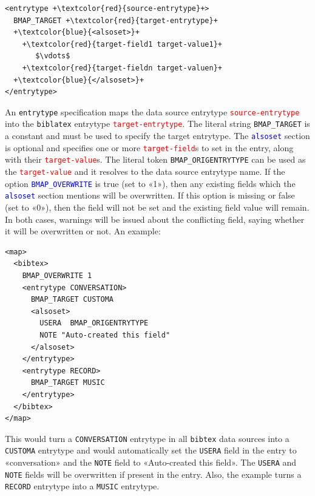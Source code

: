 \documentclass{ltxdockit}
\begin{document}

\lstset{showspaces=false}
\begin{lstlisting}[escapechar=+,mathescape=true]
<entrytype +\textcolor{red}{source-entrytype}+>
  BMAP_TARGET +\textcolor{red}{target-entrytype}+
  +\textcolor{blue}{<alsoset>}+
    +\textcolor{red}{target-field1 target-value1}+
       $\vdots$
    +\textcolor{red}{target-fieldn target-valuen}+
  +\textcolor{blue}{</alsoset>}+
</entrytype>
\end{lstlisting}

\noindent An \verb+entrytype+ specification maps the data source
entrytype \textcolor{red}{\texttt{source-entrytype}} into the \verb+biblatex+
entrytype \textcolor{red}{\texttt{target-entrytype}}. The literal string \verb+BMAP_TARGET+
is a constant and must be used to specify the target entrytype. The
\textcolor{blue}{\texttt{alsoset}} section is optional and specifies one
or more \textcolor{red}{\texttt{target-field}}s to set in the entry, along
with their \textcolor{red}{\texttt{target-value}}s. The literal token
\verb+BMAP_ORIGENTRYTYPE+ can be used as the
\textcolor{red}{\texttt{target-value}} and it resolves to the data source
entrytype name. If the option \textcolor{blue}{\texttt{BMAP\_OVERWRITE}} is
true (set to «1»), then any existing fields which the
\textcolor{blue}{\texttt{alsoset}} section mentions will be overwritten. If
this option is missing or false (set to «0»), then the field will not be
set and the existing field value will remain. In both cases, warnings will
be issued about the conflicting field, saying whether it will be
overwritten or not. An example:

\lstset{showspaces=false}
\begin{lstlisting}[escapechar=+,mathescape=true]
<map>
  <bibtex>
    BMAP_OVERWRITE 1
    <entrytype CONVERSATION>
      BMAP_TARGET CUSTOMA
      <alsoset>
        USERA  BMAP_ORIGENTRYTYPE
        NOTE "Auto-created this field"
      </alsoset>
    </entrytype>
    <entrytype RECORD>
      BMAP_TARGET MUSIC
    </entrytype>
  </bibtex>
</map>
\end{lstlisting}

\noindent This would turn a \verb+CONVERSATION+ entrytype in all
\verb+bibtex+ data sources into a \verb+CUSTOMA+ entrytype
and would automatically set the \verb+USERA+ field in the entry to
«conversation» and the \verb+NOTE+ field to «Auto-created this field». The
\verb+USERA+ and \verb+NOTE+ fields will be overwritten if present in the
entry. Also, the example turns a \verb+RECORD+ entrytype into a \verb+MUSIC+ entrytype.
\bigskip
{}
\end{document}
